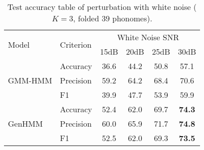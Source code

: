 \begin{table}
  \caption{Test accuracy table of perturbation with white noise ($K=3$, folded $39$ phonomes).}
  \label{tab:acc-classification39f_noise_snr}
  \centering
  \begin{tabular}{llcccc}
    \toprule
    \multirow{2}{*}{Model} & \multirow{2}{*}{Criterion} &
                                                          \multicolumn{4}{c}{White Noise SNR} \\
    
                           && {15dB} &  {20dB} &  {25dB} & {30dB}  \\
    \midrule
    \multirow{3}{*}{GMM-HMM}
                           & Accuracy & 36.6 &  44.2 &  50.8 & 57.1
    \\
                           &Precision & 59.2 &  64.2 &  68.4 & 70.6  \\
                           & F1       & 39.9 &  47.7 &  53.9 & 59.9 \\
    \midrule
    \multirow{3}{*}{GenHMM}
                           & Accuracy & 52.4 & 62.0 &  69.7 & \textbf{74.3} \\
                           &Precision & 60.0 &  65.9 &  71.7 & \textbf{74.8}  \\
                           & F1       & 52.5 &  62.0 &  69.3 & \textbf{73.5} \\
    \bottomrule                                                                  
  \end{tabular}
  \vspace{0.1cm}
\end{table}
